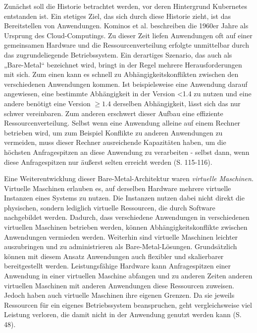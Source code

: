 \documentclass[11pt,a4paper]{article}
\begin{document}
Zunächst soll die Historie betrachtet werden, vor deren Hintergrund Kubernetes entstanden ist.
Ein stetiges Ziel, das sich durch diese Historie zieht, ist das Bereitstellen von Anwendungen.
Kominos et al. \cite{7899247} beschreiben die 1960er Jahre als Ursprung des Cloud-Computings.
Zu dieser Zeit liefen Anwendungen oft auf einer gemeinsamen Hardware und die Ressourcenverteilung erfolgte unmittelbar durch das zugrundeliegende Betriebssystem.
Ein derartiges Szenario, das auch als „Bare-Metal“ bezeichnet wird, bringt in der Regel mehrere Herausforderungen mit sich.
Zum einen kann es schnell zu Abhängigkeitskonflikten zwischen den verschiedenen Anwendungen kommen.
Ist beispielsweise eine Anwendung darauf angewiesen, eine bestimmte Abhängigkeit in der Version <1.4 zu nutzen und eine andere
benötigt eine Version \(\geq 1.4\) derselben Abhängigkeit, lässt sich das nur schwer vereinbaren.
Zum anderen erschwert dieser Aufbau eine effiziente Ressourcenverteilung.
Selbst wenn eine Anwendung alleine auf einem Rechner betrieben wird, um zum Beispiel Konflikte zu anderen
Anwendungen zu vermeiden, muss dieser Rechner ausreichende Kapazitäten haben, um die höchsten Anfragespitzen an diese Anwendung zu verarbeiten -
selbst dann, wenn diese Anfragespitzen nur äußerst selten erreicht werden \cite{Schmeling_Dargatz_2022} (S. 115-116).

Eine Weiterentwicklung dieser Bare-Metal-Architektur waren \emph{virtuelle Maschinen}.
Virtuelle Maschinen erlauben es, auf derselben Hardware mehrere virtuelle Instanzen eines
Systems zu nutzen. Die Instanzen nutzen dabei nicht direkt die physischen, sondern lediglich virtuelle Ressourcen,
die durch Software nachgebildet werden.
Dadurch, dass verschiedene Anwendungen in verschiedenen virtuellen Maschinen betrieben werden, können Abhängigkeitskonflikte zwischen Anwendungen
vermieden werden. Weiterhin sind virtuelle Maschinen leichter auszubringen und zu administrieren als Bare-Metal-Lösungen.
Grundsätzlich können mit diesem Ansatz Anwendungen auch flexibler und skalierbarer bereitgestellt werden.
Leistungsfähige Hardware kann Anfragespitzen einer Anwendung in einer virtuellen Maschine abfangen und
zu anderen Zeiten anderen virtuellen Maschinen mit anderen
Anwendungen diese Ressourcen zuweisen.
Jedoch haben auch virtuelle Maschinen ihre eigenen Grenzen.
Da sie jeweils Ressourcen für ein eigenes Betriebssystem beanspruchen, geht vergleichsweise viel Leistung verloren,
die damit nicht in der Anwendung genutzt werden kann \cite{kofler2021docker} (S. 48).
\end{document}
